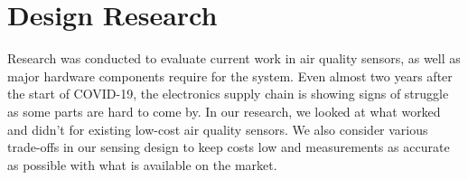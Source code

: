 
\section{Design Research}
Research was conducted to evaluate current work in air quality sensors, as well
as major hardware components require for the system. Even almost two years after
the start of COVID-19, the electronics supply chain is showing signs of struggle
as some parts are hard to come by. In our research, we looked at what worked and
didn't for existing low-cost air quality sensors. We also consider various
trade-offs in our sensing design to keep costs low and measurements as accurate
as possible with what is available on the market. 

